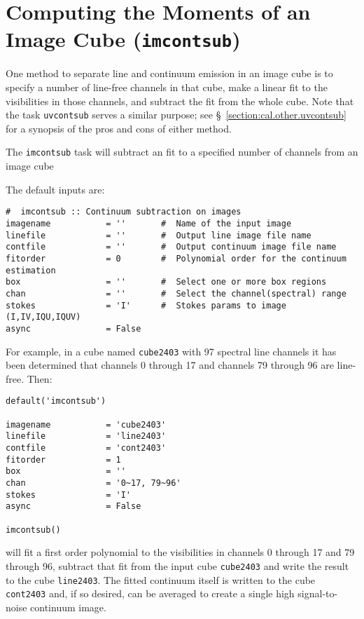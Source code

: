 \section{Computing the Moments of an Image Cube ({\tt imcontsub})}
\label{section:analysis.imcontsub}

One method to separate line and continuum emission in an image cube is
to specify a number of line-free channels in that cube, make a linear
fit to the visibilities in those channels, and subtract the fit from
the whole cube.  Note that the task {\tt uvcontsub} serves a similar
purpose; see \S~\ref{section:cal.other.uvcontsub} for a synopsis of
the pros and cons of either method.

The {\tt imcontsub} task will subtract an fit to a specified number of
channels from an image cube

The default inputs are: \small
\begin{verbatim}
#  imcontsub :: Continuum subtraction on images
imagename           = ''       #  Name of the input image
linefile            = ''       #  Output line image file name
contfile            = ''       #  Output continuum image file name
fitorder            = 0        #  Polynomial order for the continuum estimation
box                 = ''       #  Select one or more box regions
chan                = ''       #  Select the channel(spectral) range
stokes              = 'I'      #  Stokes params to image (I,IV,IQU,IQUV)
async               = False        
\end{verbatim}
\normalsize

For example, in a cube named {\tt cube2403} with 97 spectral line
channels it has been determined that channels 0 through 17 and
channels 79 through 96 are line-free.  Then:
 
\small
\begin{verbatim}
default('imcontsub')

imagename           = 'cube2403'
linefile            = 'line2403'
contfile            = 'cont2403'
fitorder            = 1
box                 = ''
chan                = '0~17, 79~96'
stokes              = 'I'
async               = False        

imcontsub()
\end{verbatim}
\normalsize

will fit a first order polynomial to the visibilities in channels 0
through 17 and 79 through 96, subtract that fit from the input cube
{\tt cube2403} and write the result to the cube {\tt line2403}.  The
fitted continuum itself is written to the cube {\tt cont2403} and, if
so desired, can be averaged to create a single high signal-to-noise
continuum image.



